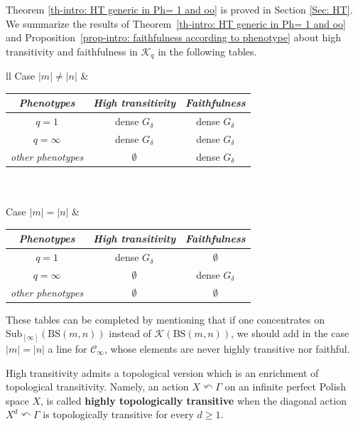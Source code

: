 \documentclass[12pt]{article}
\numberwithin{equation}{section}
\theoremstyle{definition}
\def\defin#1{\textbf{#1}}
\newcommand{\abs}[1]{\left\lvert #1\right\rvert}
\newcommand{\PK}{\mathcal{K}}
\newcommand\BSo{\mathrm{BS}}
\newcommand{\Sub}{\mathrm{Sub}}
\begin{document}
Theorem \ref{th-intro: HT generic in Ph= 1 and oo} is
proved in Section \ref{Sec: HT}.
We summarize the results of Theorem~\ref{th-intro: HT generic in Ph= 1 and oo} and Proposition~\ref{prop-intro: faithfulness according to phenotype} about high transitivity and faithfulness in $\PK_q$ in the following tables. 
\begin{center}
\begin{tabular}{ll}
Case $\abs{m} \neq \abs{n}$
&
\begin{tabular}{|c||c|c|}\hline
 \emph{Phenotypes}& \emph{High transitivity} & \emph{Faithfulness} \\
\hline\hline
  $q=1$ & dense \( G_\delta \) & dense \( G_\delta \) \\
  \hline
  $q=\infty$ & dense \( G_\delta \) & dense \( G_\delta \)\\
  \hline
  \emph{other phenotypes} & $\emptyset$  & dense \( G_\delta \)\\
  \hline
  \end{tabular}
\\
\\
 Case $\abs{m} = \abs{n} $ 
 &
\begin{tabular}{|c||c|c|}\hline
 \emph{Phenotypes}& \emph{High transitivity} & \emph{Faithfulness} \\
\hline\hline
  $q=1$ & dense \( G_\delta \) & $\emptyset$ \\
  \hline
  $q=\infty$ & $\emptyset$  & dense \( G_\delta \)\\
  \hline
  \emph{other phenotypes} & $\emptyset$ &  \( \emptyset \)\\
  \hline
  \end{tabular}
  \end{tabular}
\end{center}  
\medskip
These tables can be completed by mentioning that
if one concentrates on 
$\Sub_{[\infty]}(\BSo(m,n))$ instead of $\PK(\BSo(m,n))$,
we should add in the case $\abs{m}=\abs{n}$
a line for $\mathcal C_{\infty}$,
whose elements are never highly transitive nor faithful.










High transitivity admits a topological version which is an enrichment of topological transitivity.
Namely, an action $X\curvearrowleft \Gamma$ on an infinite perfect Polish space $X$,
is called \defin{highly topologically transitive} when the diagonal action $X^d\curvearrowleft \Gamma$ is topologically transitive for every \(d\geq 1\). 
\end{document}
